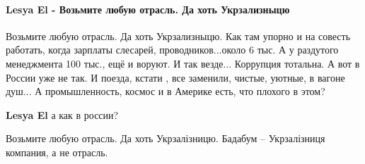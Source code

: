  
 
 
 
 
\paragraph{Lesya El - Возьмите любую отрасль. Да хоть Укрзализныцю}
\label{sec:14_07_2021.fb.krjukova_svetlana.1.statja_putina_mnenie.cmt.lesya_el_ukrzaliznycja}

\begin{itemize}
 
Возьмите любую отрасль. Да хоть Укрзализныцю. Как там упорно и на совесть
работать, когда зарплаты слесарей, проводников...около 6 тыс. А у раздутого
менеджмента 100 тыс., ещё и воруют. И так везде... Коррупция тотальна. А вот в
России уже не так. И поезда, кстати , все заменили, чистые, уютные, в вагоне
душ... А промышленность, космос и в Америке есть, что плохого в этом?

\begin{itemize}
 
\textbf{Lesya El} а как в россии?

 
Возьмите любую отрасль.
Да хоть Укрзалізницю.
Бадабум – Укрзалізниця компания, а не отрасль.

 

\end{itemize}
\end{itemize}
